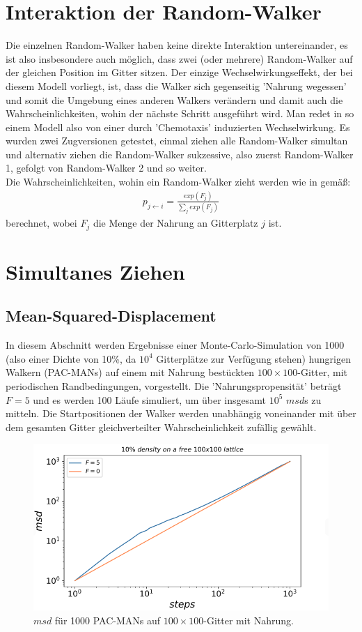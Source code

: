 \documentclass[a4paper, 12pt]{report}
\begin{document}
\section{Interaktion der Random-Walker}
Die einzelnen Random-Walker haben keine direkte Interaktion untereinander, es ist also insbesondere auch möglich, dass zwei (oder mehrere) Random-Walker auf der gleichen Position im Gitter sitzen. Der einzige Wechselwirkungseffekt, der bei diesem Modell vorliegt, ist, dass die Walker sich gegenseitig 'Nahrung wegessen' und somit die Umgebung eines anderen Walkers verändern und damit auch die Wahrscheinlichkeiten, wohin der nächste Schritt ausgeführt wird. Man redet in so einem Modell also von einer durch 'Chemotaxis' induzierten Wechselwirkung. Es wurden zwei Zugversionen getestet, einmal ziehen alle Random-Walker simultan und alternativ ziehen die Random-Walker sukzessive, also zuerst Random-Walker 1, gefolgt von Random-Walker 2 und so weiter. \\
\noindent Die Wahrscheinlichkeiten, wohin ein Random-Walker zieht werden wie in \cite{doi:10.1063/1.4999485} gemäß:
\begin{align}
p_{j \leftarrow i} = \frac{exp({F_j})}{\sum_j exp({F_j})}
\label{Wkeiten}
\end{align}
berechnet, wobei $F_j$ die Menge der Nahrung an Gitterplatz $j$ ist.

\section{Simultanes Ziehen\label{gleichzeitig}}
\subsection{Mean-Squared-Displacement}
In diesem Abschnitt werden Ergebnisse einer Monte-Carlo-Simulation von 1000 (also einer Dichte von 10\%, da $10^4$ Gitterplätze zur Verfügung stehen) hungrigen Walkern (PAC-MANs) auf einem mit Nahrung bestückten $100 \times 100$-Gitter, mit periodischen Randbedingungen, vorgestellt. Die 'Nahrungspropensität' beträgt $F=5$ und es werden 100 Läufe simuliert, um über insgesamt $10^5$ $msd$s zu mitteln. Die Startpositionen der Walker werden unabhängig voneinander mit über dem gesamten Gitter gleichverteilter Wahrscheinlichkeit zufällig gewählt.

\begin{figure}[h!]
	\centering
	\includegraphics[scale=0.8]{msd10_1.png}
	\caption{$msd$ für 1000 PAC-MANs auf $100\times 100$-Gitter mit Nahrung.}
\end{figure}
\end{document}

